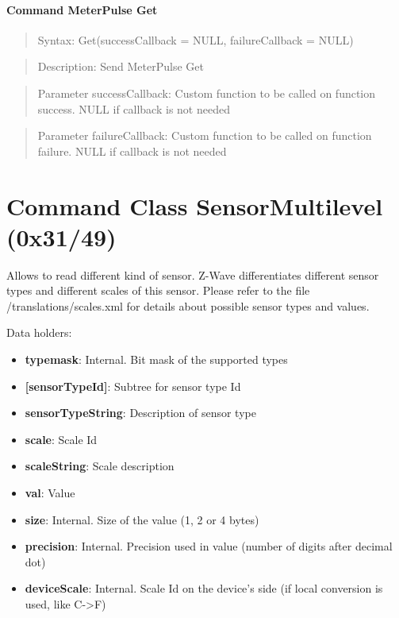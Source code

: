 \paragraph{Command MeterPulse Get}
\begin{quote}Syntax: Get(successCallback = NULL, failureCallback = NULL)\end{quote}
\begin{quote}Description: Send MeterPulse Get\end{quote}
\begin{quote}Parameter successCallback: Custom function to be called on function success. NULL if callback is not needed\end{quote}
\begin{quote}Parameter failureCallback: Custom function to be called on function failure. NULL if callback is not needed\end{quote}



\section{Command Class SensorMultilevel (0x31/49)}

Allows to read different kind of sensor. Z-Wave differentiates different sensor types and different scales of this sensor. Please refer to the file /translations/scales.xml for details about possible sensor types and values.
\newline

\noindent
Data holders:

\begin{itemize}
\item \textbf{typemask}: Internal. Bit mask of the supported types
\item \textbf{[sensorTypeId]}: Subtree for sensor type Id
\item \qquad\textbf{sensorTypeString}: Description of sensor type
\item \qquad\textbf{scale}: Scale Id
\item \qquad\textbf{scaleString}: Scale description
\item \qquad\textbf{val}: Value
\item \qquad\textbf{size}: Internal. Size of the value (1, 2 or 4 bytes)
\item \qquad\textbf{precision}: Internal. Precision used in value (number of digits after decimal dot)
\item \qquad\textbf{deviceScale}: Internal. Scale Id on the device's side (if local conversion is used, like C->F)
\end{itemize}

